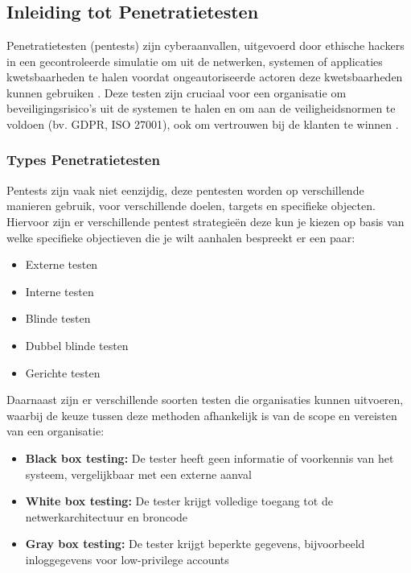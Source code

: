 
\chapter{}
\label{ch:Literatuurstudie}

\section{Inleiding tot Penetratietesten}
Penetratietesten (pentests) zijn cyberaanvallen, uitgevoerd door ethische hackers in een gecontroleerde simulatie om uit de netwerken, systemen of applicaties kwetsbaarheden te halen voordat ongeautoriseerde actoren deze kwetsbaarheden kunnen gebruiken \textcite{Shebli}. 
Deze testen zijn cruciaal voor een organisatie om beveiligingsrisico's uit de systemen te halen en om aan de veiligheidsnormen te voldoen (bv. GDPR, ISO 27001), ook om vertrouwen bij de klanten te winnen \parencite{Dalalana2017}.

\subsection{Types Penetratietesten}
Pentests zijn vaak niet eenzijdig, deze pentesten worden op verschillende manieren gebruik, voor verschillende doelen, targets en specifieke objecten.
Hiervoor zijn er verschillende pentest strategieën deze kun je kiezen op basis van welke specifieke objectieven die je wilt aanhalen \textcite{Vats2020} bespreekt er een paar:\sloppy

\begin{itemize}
    \item Externe testen
    \item Interne testen
    \item Blinde testen
    \item Dubbel blinde testen
    \item Gerichte testen
\end{itemize}

Daarnaast zijn er verschillende soorten testen die organisaties kunnen uitvoeren, waarbij de keuze tussen deze methoden afhankelijk is van de scope en vereisten van een organisatie:

\begin{itemize}
    \item \textbf{Black box testing:} De tester heeft geen informatie of voorkennis van het systeem, vergelijkbaar met een externe aanval
    \item \textbf{White box testing:} De tester krijgt volledige toegang tot de netwerkarchitectuur en broncode
    \item \textbf{Gray box testing:} De tester krijgt beperkte gegevens, bijvoorbeeld inloggegevens voor low-privilege accounts
\end{itemize}
\autocite{Khamdamovich2021}

